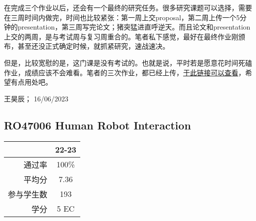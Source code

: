 在完成三个作业以后，还会有一个最终的研究任务。很多研究课题可以选择，需要在三周时间内做完，时间也比较紧张：第一周上交proposal，第二周上传一个5分钟的presentation，第三周写完论文；猪突猛进直呼逆天。而且论文和presentation上交的两周，是与考试周与复习周重合的。笔者私下感觉，最好在最终作业刚颁布，甚至还没正式确定时候，就抓紧研究，速战速决。

但是，比较宽慰的是，这门课是没有考试的。也就是说，平时若是愿意花时间死磕作业，成绩应该不会难看。笔者的三次作业，都已经上传，\href{https://drive.google.com/drive/folders/1mJun-EmYGX1DovFISP9lXZNkdnutQpuh?usp=sharing}{\uline{于此链接可以查看}}，希望有点用处吧。
\begin{flushright}
王昊辰； 16/06/2023
\end{flushright}


\subsection{RO47006 Human Robot Interaction}\hypertarget{RO47006}{} 
\begin{minipage}{0.45\textwidth}
\centering
{}
\end{minipage}%
\begin{minipage}{0.45\textwidth}
\raggedleft
\begin{tabular}{r|c}
\textbf{ } & \textbf{22-23} \\ \hline
通过率 & 100\% \\ 
平均分 & 7.36 \\ 
参与学生数 & 193 \\ 
学分 & 5 EC\\
\end{tabular}
\end{minipage}\\

